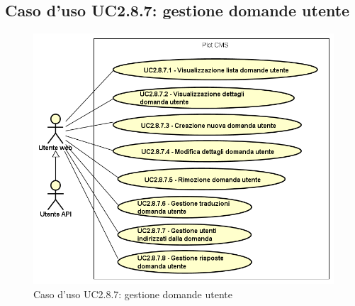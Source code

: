 \hypertarget{UC2.8.7}{}
\subsection{Caso d'uso UC2.8.7: gestione domande utente}

        \begin{figure}[H]
            \centering
            \includegraphics[scale=0.95, width=\textwidth]{immagini/usecase/UC2-8-7.png}
            \caption{Caso d'uso UC2.8.7: gestione domande utente}\label{fig:UC2.8.7} 
        \end{figure}
